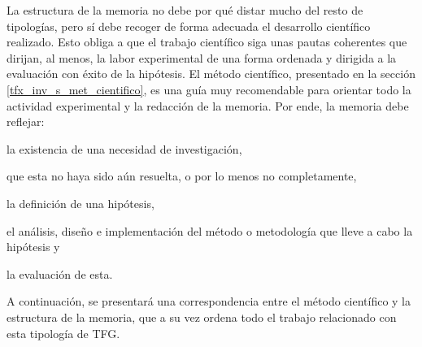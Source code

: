 La estructura de la memoria no debe por qué distar mucho del resto de tipologías, pero sí debe recoger de forma adecuada el desarrollo científico realizado. Esto obliga a que el trabajo científico siga unas pautas coherentes que dirijan, al menos, la labor experimental de una forma ordenada y dirigida a la evaluación con éxito de la hipótesis. El método científico, presentado en la sección \ref{tfx_inv_s_met_cientifico}, es una guía muy recomendable para orientar todo la actividad experimental y la redacción de la memoria. Por ende, la memoria debe reflejar: \begin{enumerate*}[label=(\arabic*)]\item la existencia de una necesidad de investigación, \item que esta no haya sido aún resuelta, o por lo menos no completamente, \item la definición de una hipótesis, \item el análisis, diseño e implementación del método o metodología que lleve a cabo la hipótesis y \item la evaluación de esta.\end{enumerate*} A continuación, se presentará una correspondencia entre el método científico y la estructura de la memoria, que a su vez ordena todo el trabajo relacionado con esta tipología de TFG.

